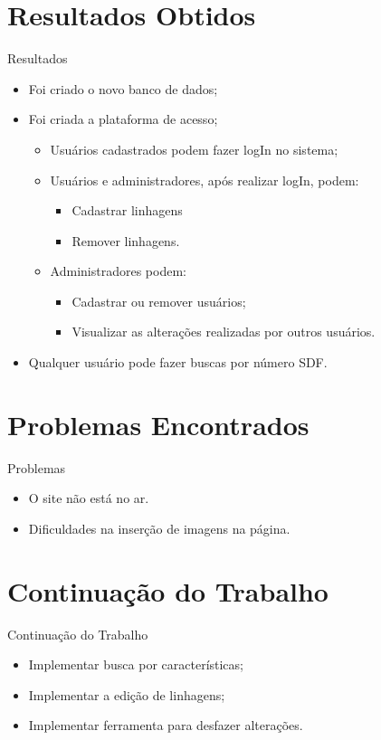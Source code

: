 \documentclass{beamer}
\begin{document}
  \section{Resultados Obtidos}
  \begin{frame}{ Resultados }
        \begin{itemize}
            \item Foi criado o novo banco de dados;
            \item Foi criada a plataforma de acesso;
            \begin{itemize}
                \item Usu\'arios cadastrados podem fazer logIn no sistema;
                \item Usu\'arios e administradores, ap\'os realizar logIn, podem:
                \begin{itemize}
                    \item Cadastrar linhagens
                    \item Remover linhagens.
                \end{itemize}
                \item Administradores podem:
                \begin{itemize}
                    \item Cadastrar ou remover usu\'arios;
                    \item Visualizar as altera\c{c}\~oes realizadas por outros usu\'arios.
                \end{itemize}
            \end{itemize}
            \item Qualquer usu\'ario pode fazer buscas por n\'umero SDF.
        \end{itemize}
  \end{frame}
  
  \section{Problemas Encontrados}
  \begin{frame}{Problemas}
        \begin{itemize}
            \item O site n\~ao est\'a no ar.
            \item Dificuldades na inser\c{c}\~ao de imagens na p\'agina.
        \end{itemize}
  \end{frame}
  
  \section{Continua\c{c}\~ao do Trabalho}
  \begin{frame}{Continua\c{c}\~ao do Trabalho}
        \begin{itemize}
            \item Implementar busca por caracter\'isticas;
            \item Implementar a edi\c{c}\~ao de linhagens;
            \item Implementar ferramenta para desfazer altera\c{c}\~oes.
        \end{itemize}
  \end{frame}
\end{document}
